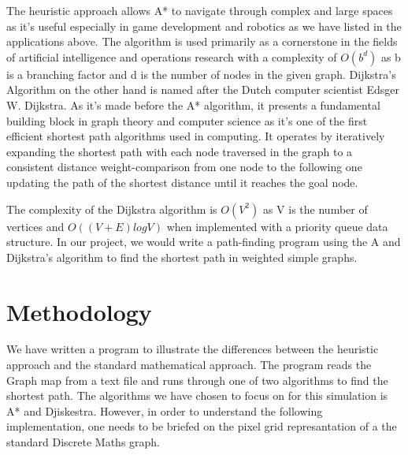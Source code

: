 \documentclass[twocolumn]{article}
\begin{document}
The heuristic approach allows A* to navigate through complex and large spaces as it’s useful especially in game development and robotics as we have listed in the applications above. The algorithm is used primarily as a cornerstone in the fields of artificial intelligence and operations research with a complexity of $O(b^d)$ as b is a branching factor and d is the number of nodes in the given graph. Dijkstra’s Algorithm on the other hand is named after the Dutch computer scientist Edsger W. Dijkstra. As it’s made before the A* algorithm, it presents a fundamental building block in graph theory and computer science as it’s one of the first efficient shortest path algorithms used in computing. It operates by iteratively expanding the shortest path with each node traversed in the graph to a consistent distance weight-comparison from one node to the following one updating the path of the shortest distance until it reaches the goal node. 

The complexity of the Dijkstra algorithm is $O(V^2)$ as V is the number of vertices and $O((V+E)logV)$ when implemented with a priority queue data structure. In our project, we would write a path-finding program using the A and Dijkstra’s algorithm to find the shortest path in weighted simple graphs.
\section{Methodology}
We have written a program to illustrate the differences between the heuristic approach and the standard mathematical approach. The program reads the Graph map from a text file and runs through one of two algorithms to find the shortest path. The algorithms we have chosen to focus on for this simulation is A* and Djiskestra. However, in order to understand the following implementation, one needs to be briefed on the pixel grid represantation of a the standard Discrete Maths graph.
\end{document}
